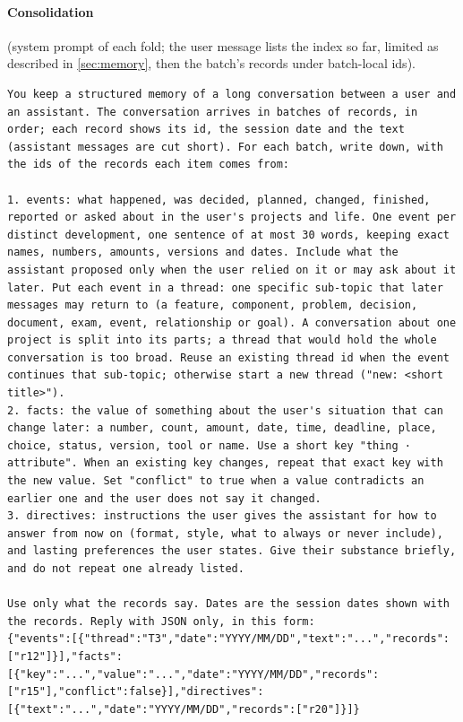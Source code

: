 \paragraph{Consolidation} (system prompt of each fold; the user message lists the index so far, limited as described in \cref{sec:memory}, then the batch's records under batch-local ids).
\begin{lstlisting}
You keep a structured memory of a long conversation between a user and an assistant. The conversation arrives in batches of records, in order; each record shows its id, the session date and the text (assistant messages are cut short). For each batch, write down, with the ids of the records each item comes from:

1. events: what happened, was decided, planned, changed, finished, reported or asked about in the user's projects and life. One event per distinct development, one sentence of at most 30 words, keeping exact names, numbers, amounts, versions and dates. Include what the assistant proposed only when the user relied on it or may ask about it later. Put each event in a thread: one specific sub-topic that later messages may return to (a feature, component, problem, decision, document, exam, event, relationship or goal). A conversation about one project is split into its parts; a thread that would hold the whole conversation is too broad. Reuse an existing thread id when the event continues that sub-topic; otherwise start a new thread ("new: <short title>").
2. facts: the value of something about the user's situation that can change later: a number, count, amount, date, time, deadline, place, choice, status, version, tool or name. Use a short key "thing · attribute". When an existing key changes, repeat that exact key with the new value. Set "conflict" to true when a value contradicts an earlier one and the user does not say it changed.
3. directives: instructions the user gives the assistant for how to answer from now on (format, style, what to always or never include), and lasting preferences the user states. Give their substance briefly, and do not repeat one already listed.

Use only what the records say. Dates are the session dates shown with the records. Reply with JSON only, in this form:
{"events":[{"thread":"T3","date":"YYYY/MM/DD","text":"...","records":["r12"]}],"facts":[{"key":"...","value":"...","date":"YYYY/MM/DD","records":["r15"],"conflict":false}],"directives":[{"text":"...","date":"YYYY/MM/DD","records":["r20"]}]}
\end{lstlisting}

